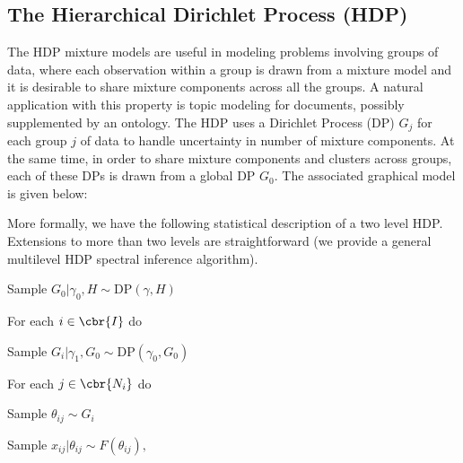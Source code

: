 \documentclass[twoside,11pt]{article}
\begin{document}
\subsection{The Hierarchical Dirichlet Process (HDP)}
\label{sec:hdp}
The HDP mixture models are useful in modeling problems involving groups of
data, where each observation within a group is drawn from a mixture
model and it is desirable to share mixture components across all the
groups. A natural application with this property is topic modeling
for documents, possibly supplemented by an ontology.
The HDP \citep{TehJorBeaBle06} uses a Dirichlet Process (DP) \citep{Antoniak74,
  Ferguson73} $G_j$ for each group $j$ of data to handle uncertainty
in number of mixture components. At the same time, in order to share mixture
components and clusters across groups, each of these DPs is drawn from a
global DP $G_0$. The associated graphical model is given below:
\begin{center}
\end{center}
More formally, we have the following statistical description of a two
level HDP. Extensions to more than two levels are straightforward (we
provide a general multilevel HDP spectral inference algorithm). 
%
\begin{enumerate*}
\item Sample $G_0|\gamma_0,H \sim \mathrm{DP}(\gamma, H)$
\item For each $i \in \cbr{I}$ do
\begin{enumerate*}
\item Sample $G_i|\gamma_1, G_0 \sim \mathrm{DP}(\gamma_0,G_0)$
\item For each $j \in \cbr{N_i}$ do
\begin{enumerate*}
\item Sample $\theta_{ij} \sim G_i$
\item Sample $x_{ij}|\theta_{ij} \sim F(\theta_{ij}),$
\end{enumerate*}
\end{enumerate*}
\end{enumerate*}
\end{document}
